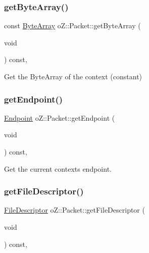 \subsubsection{\texorpdfstring{getByteArray()}{getByteArray()}\hspace{0.1cm}{\footnotesize\ttfamily [2/2]}}
{\footnotesize\ttfamily const \mbox{\hyperlink{namespaceo_z_abfa3f5a46e5c7584615dc1dd33fcafb6}{Byte\+Array}} o\+Z\+::\+Packet\+::get\+Byte\+Array (\begin{DoxyParamCaption}\item[{void}]{ }\end{DoxyParamCaption}) const\hspace{0.3cm}{\ttfamily [inline]}, {\ttfamily [noexcept]}}



Get the Byte\+Array of the context (constant) 

\mbox{\label{classo_z_1_1_packet_a89367cc491fdfdb6bf88eda9bc4eb219}} 
\subsubsection{\texorpdfstring{getEndpoint()}{getEndpoint()}}
{\footnotesize\ttfamily \mbox{\hyperlink{classo_z_1_1_endpoint}{Endpoint}} o\+Z\+::\+Packet\+::get\+Endpoint (\begin{DoxyParamCaption}\item[{void}]{ }\end{DoxyParamCaption}) const\hspace{0.3cm}{\ttfamily [inline]}, {\ttfamily [noexcept]}}



Get the current context\textquotesingle{}s endpoint. 

\mbox{\label{classo_z_1_1_packet_a65cfd7021de4eaf78f716143b82cd4a1}} 
\subsubsection{\texorpdfstring{getFileDescriptor()}{getFileDescriptor()}}
{\footnotesize\ttfamily \mbox{\hyperlink{namespaceo_z_acbb8d05709257b6414b3979597f88c0c}{File\+Descriptor}} o\+Z\+::\+Packet\+::get\+File\+Descriptor (\begin{DoxyParamCaption}\item[{void}]{ }\end{DoxyParamCaption}) const\hspace{0.3cm}{\ttfamily [inline]}, {\ttfamily [noexcept]}}



